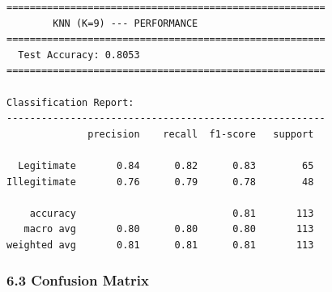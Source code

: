 \documentclass[11pt]{article}
\begin{document}
    \begin{Verbatim}[commandchars=\\\{\}]
=======================================================
        KNN (K=9) --- PERFORMANCE
=======================================================
  Test Accuracy: 0.8053
=======================================================

Classification Report:
-------------------------------------------------------
              precision    recall  f1-score   support

  Legitimate       0.84      0.82      0.83        65
Illegitimate       0.76      0.79      0.78        48

    accuracy                           0.81       113
   macro avg       0.80      0.80      0.80       113
weighted avg       0.81      0.81      0.81       113

    \end{Verbatim}

    \subsubsection{6.3 Confusion Matrix}\label{confusion-matrix}
\end{document}
